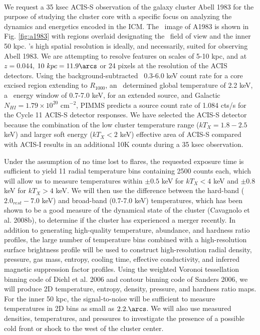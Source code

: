 \documentclass[letterpaper,11pt,twocolumn]{article}
\begin{document}
\\
We request a 35 ksec ACIS-S observation of the galaxy cluster Abell
1983 for the purpose of studying the cluster core with a specific
focus on analyzing the dynamics and energetics encoded in the ICM. The
\xmm\ image of A1983 is shown in Fig. \ref{fig:a1983} with regions
overlaid designating the \chandra\ field of view and the inner 50
kpc. \chandra's high spatial resolution is ideally, and necessarily,
suited for observing Abell 1983. We are attempting to resolve features
on scales of 5-10 kpc, and at $z = 0.044$, $10\ kpc = 11.9\arcs$ or 24
pixels at the resolution of the ACIS detectors. Using the
background-subtracted \xmm\ 0.3-6.0 keV count rate for a core excised
region extending to $R_{1000}$, an \xmm\ determined global temperature
of 2.2 keV, a \chandra\ energy window of 0.7-7.0 keV, for an extended
source, and Galactic $N_{HI} = 1.79\times10^{20}$ cm$^{-2}$, PIMMS
predicts a source count rate of 1.084 cts/s for the Cycle 11 ACIS-S
detector responses. We have selected the ACIS-S detector because the
combination of the low cluster temperature range ($kT_X = 1.8-2.5$
keV) and larger soft energy ($kT_X < 2$ keV) effective area of ACIS-S
compared with ACIS-I results in an additional 10K counts during a 35
ksec observation.

Under the assumption of no time lost to flares, the requested exposure
time is sufficient to yield 11 radial temperature bins containing 2500
counts each, which will allow us to measure temperatures within $\pm
0.5$ keV for $kT_X < 4$ keV and $\pm 0.8$ keV for $kT_X > 4$ keV. We
will then use the difference between the hard-band ($2.0_{rest}-7.0$
keV) and broad-band (0.7-7.0 keV) temperatures, which has been shown
to be a good measure of the dynamical state of the cluster (Cavagnolo
et al. 2008b), to determine if the cluster has experienced a merger
recently. In addition to generating high-quality temperature,
abundance, and hardness ratio profiles, the large number of
temperature bins combined with a high-resolution surface brightness
profile will be used to construct high-resolution radial density,
pressure, gas mass, entropy, cooling time, effective conductivity, and
inferred magnetic suppression factor profiles. Using the weighted
Voronoi tessellation binning code of Diehl et al. 2006 and contour
binning code of Sanders 2006, we will produce 2D temperature, entropy,
density, pressure, and hardness ratio maps. For the inner 50 kpc, the
signal-to-noise will be sufficient to measure temperatures in 2D bins
as small as $2.2.\arcs$. We will also use measured densities,
temperatures, and pressures to investigate the presence of a possible
cold front or shock to the west of the cluster center.
\end{document}
